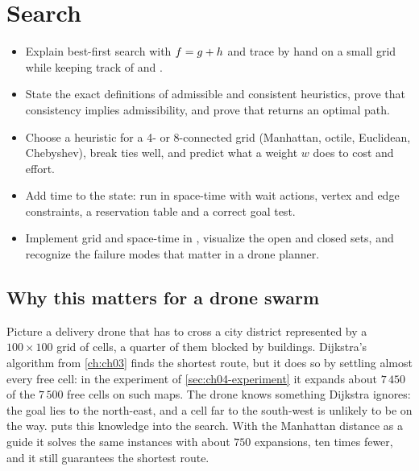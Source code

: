 \chapter{\astar Search}
\label{ch:ch04}

\begin{objectives}
\begin{itemize}
  \item Explain best-first search with $f = g + h$ and trace \astar by hand on a small grid while keeping track of \Open and \Closed.
  \item State the exact definitions of admissible and consistent heuristics, prove that consistency implies admissibility, and prove that \astar returns an optimal path.
  \item Choose a heuristic for a 4- or 8-connected grid (Manhattan, octile, Euclidean, Chebyshev), break ties well, and predict what a weight $w$ does to cost and effort.
  \item Add time to the state: run \astar in space-time with wait actions, vertex and edge constraints, a reservation table and a correct goal test.
  \item Implement grid \astar and space-time \astar in \python, visualize the open and closed sets, and recognize the failure modes that matter in a drone planner.
\end{itemize}
\end{objectives}

\section{Why this matters for a drone swarm}
\label{sec:ch04-motivation}

Picture a delivery drone that has to cross a city district represented by a
$100 \times 100$ grid of cells, a quarter of them blocked by buildings.
Dijkstra's algorithm from \cref{ch:ch03} finds the shortest route, but it does
so by settling almost every free cell: in the experiment of
\cref{sec:ch04-experiment} it expands about $7\,450$ of the $7\,500$ free cells
on such maps. The drone knows something Dijkstra ignores: the goal lies to the
north-east, and a cell far to the south-west is unlikely to be on the way. \astar
puts this knowledge into the search. With the Manhattan distance as a guide it
solves the same instances with about $750$ expansions, ten times fewer, and it
still guarantees the shortest route.

